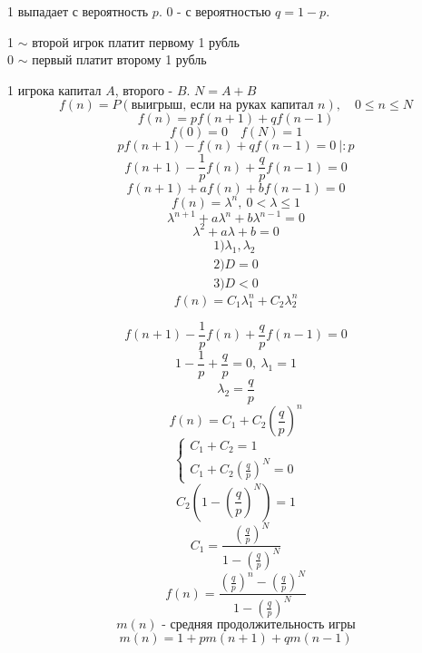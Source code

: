 \documentclass[a4paper]{article}
\theoremstyle{definition}
\theoremstyle{remark}
\begin{document}
1 выпадает с вероятность $ p $. 0 - с вероятностью $ q = 1 - p $.  

1 $ \sim $ второй игрок платит первому 1 рубль\\
0 $ \sim $ первый платит второму 1 рубль

1 игрока капитал $ A $, второго - $ B $. $ N = A + B $  
\[
    f(n) = P(\text{выигрыш, если на руках капитал }n), \quad 0 \leq n \leq N
\]
\[
    f(n) = pf(n+1) + qf(n-1)
\]
\[
    f(0) = 0 \quad f(N) = 1
\]
\[
    pf(n+1) - f(n) + qf(n-1) = 0 \ | : p
\]
\[
    f(n+1) - \frac{1}{p} f(n) + \frac{q}{p} f(n-1) = 0
\]
\begin{equation}
    f(n+1) + af(n) + bf(n-1) = 0
\end{equation}
\[
    f(n) = \lambda^{n}, \ 0 < \lambda \leq 1
\]
\[
    \lambda^{n+1} + a\lambda^{n} + b \lambda^{n-1} = 0
\]
\[
    \lambda^2 + a \lambda + b = 0
\]
\begin{align*}
    1) \lambda_1, \lambda_2\\
    2) D = 0\\
    3) D < 0
\end{align*}
\[
    f(n) = C_1 \lambda_1^{n} + C_2 \lambda_2^{n}
\]

\[
    f(n+1) - \frac{1}{p} f(n) + \frac{q}{p} f(n-1) = 0
\]
\[
    1 - \frac{1}{p} + \frac{q}{p} = 0, \ \lambda_1 = 1
\]
\[
    \lambda_2 = \frac{q}{p} 
\]
\[
    f(n) = C_1 + C_2 \left( \frac{q}{p} \right)^{n}
\]
\[
    \begin{cases}
        C_1 + C_2 = 1\\
        C_1 + C_2 \left( \frac{q}{p} \right)^{N} = 0 
    \end{cases}
\]
\[
    C_2 \left( 1 - \left(\frac{q}{p}\right)^{N}\right) = 1
\]
\[
    C_1 = \frac{\left(\frac{q}{p}\right)^{N}}{1-\left(\frac{q}{p}\right)^{N}} 
\]
\[
    f(n) = \frac{\left(\frac{q}{p}\right)^{n} - {\left(\frac{q}{p}\right)^{N}}}
    {1 - {\left(\frac{q}{p}\right)^{N}}} 
\]
 \[
     m(n) \text{ - средняя продолжительность игры}
 \]
 \[
     m(n) = 1 + pm(n+1) + qm(n-1)
 \]
\end{document}
